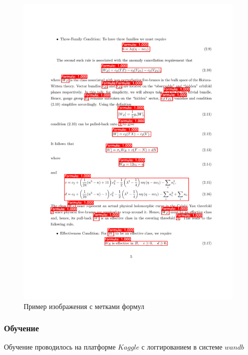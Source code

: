 \begin{figure}
    \includegraphics[scale=0.5]{img/dataset/parsed.png}
    \caption{Пример изображения с метками формул}
    \label{dataset_output}
\end{figure}

\subsubsection{Обучение}

Обучение проводилось на платформе $Kaggle$ \cite{kaggle} с логгированием в системе $wandb$ \cite{wandb}